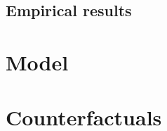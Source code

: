 \documentclass[12pt]{article}
\begin{document}
\subsection{Empirical results}

\section{Model}

\section{Counterfactuals}
\end{document}
